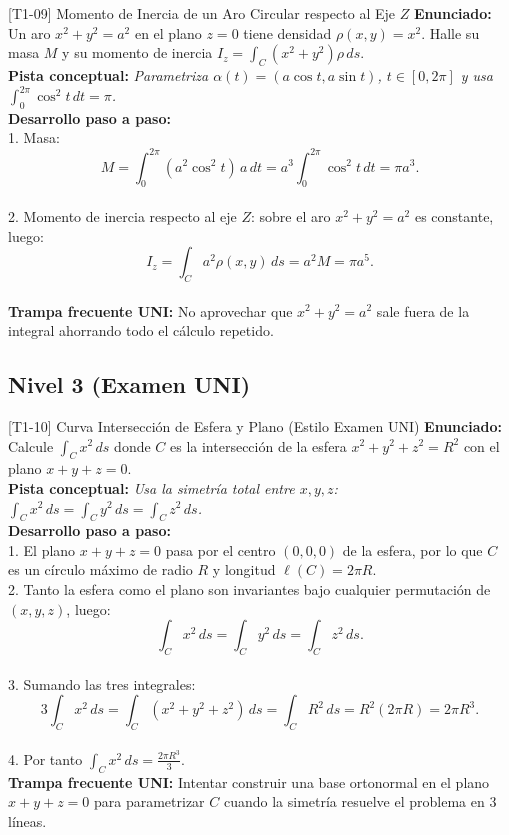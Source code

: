 \documentclass[11pt,a4paper]{article}
\begin{document}
\begin{ejerciciobox}{[T1-09] Momento de Inercia de un Aro Circular respecto al Eje $Z$}
\textbf{Enunciado:} Un aro $x^2 + y^2 = a^2$ en el plano $z=0$ tiene densidad $\rho(x,y) = x^2$. Halle su masa $M$ y su momento de inercia $I_z = \int_C (x^2+y^2)\rho\,ds$.\\[0.2cm]
\textbf{Pista conceptual:} \emph{Parametriza $\alpha(t) = (a\cos t, a\sin t)$, $t \in [0, 2\pi]$ y usa $\int_0^{2\pi} \cos^2 t\,dt = \pi$.}\\[0.2cm]
\textbf{Desarrollo paso a paso:}\\
1. Masa:\\
$$M = \int_0^{2\pi} (a^2\cos^2 t)\,a\,dt = a^3\int_0^{2\pi} \cos^2 t\,dt = \pi a^3.$$\\
2. Momento de inercia respecto al eje $Z$: sobre el aro $x^2+y^2 = a^2$ es constante, luego:\\
$$I_z = \int_C a^2 \rho(x,y)\,ds = a^2 M = \pi a^5.$$\\[0.2cm]
\textbf{Trampa frecuente UNI:} No aprovechar que $x^2+y^2 = a^2$ sale fuera de la integral ahorrando todo el cálculo repetido.
\end{ejerciciobox}

\subsection{Nivel 3 (Examen UNI)}

\begin{ejerciciobox}{[T1-10] Curva Intersección de Esfera y Plano (Estilo Examen UNI)}
\textbf{Enunciado:} Calcule $\int_C x^2\,ds$ donde $C$ es la intersección de la esfera $x^2+y^2+z^2=R^2$ con el plano $x + y + z = 0$.\\[0.2cm]
\textbf{Pista conceptual:} \emph{Usa la simetría total entre $x, y, z$: $\int_C x^2\,ds = \int_C y^2\,ds = \int_C z^2\,ds$.}\\[0.2cm]
\textbf{Desarrollo paso a paso:}\\
1. El plano $x+y+z=0$ pasa por el centro $(0,0,0)$ de la esfera, por lo que $C$ es un círculo máximo de radio $R$ y longitud $\ell(C) = 2\pi R$.\\
2. Tanto la esfera como el plano son invariantes bajo cualquier permutación de $(x,y,z)$, luego:\\
$$\int_C x^2\,ds = \int_C y^2\,ds = \int_C z^2\,ds.$$\\
3. Sumando las tres integrales:\\
$$3\int_C x^2\,ds = \int_C (x^2 + y^2 + z^2)\,ds = \int_C R^2\,ds = R^2(2\pi R) = 2\pi R^3.$$\\
4. Por tanto $\int_C x^2\,ds = \frac{2\pi R^3}{3}$.\\[0.2cm]
\textbf{Trampa frecuente UNI:} Intentar construir una base ortonormal en el plano $x+y+z=0$ para parametrizar $C$ cuando la simetría resuelve el problema en 3 líneas.
\end{ejerciciobox}
\end{document}
